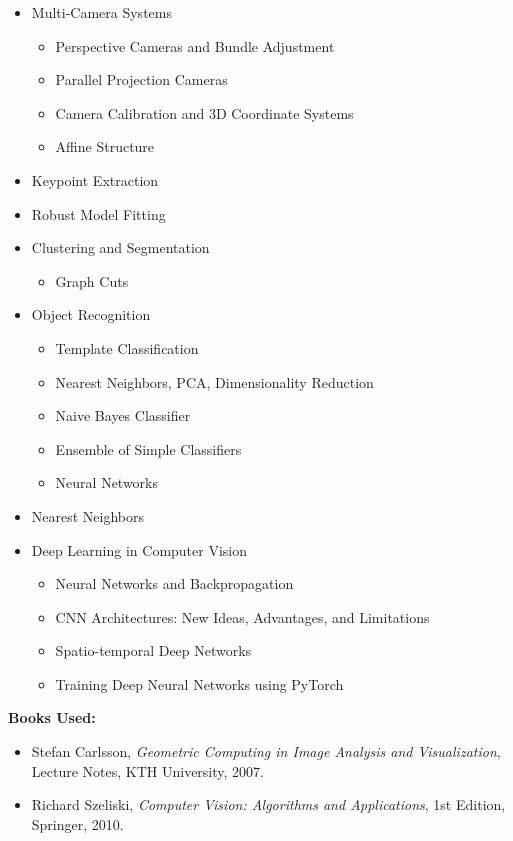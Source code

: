 \documentclass[12pt]{article}
\begin{document}
\begin{itemize}
    \item Multi-Camera Systems
    \begin{itemize}
        \item Perspective Cameras and Bundle Adjustment
        \item Parallel Projection Cameras
        \item Camera Calibration and 3D Coordinate Systems
        \item Affine Structure
    \end{itemize}
    
    \item Keypoint Extraction
    \item Robust Model Fitting
    \item Clustering and Segmentation
    \begin{itemize}
        \item Graph Cuts
    \end{itemize}
    
    \item Object Recognition
    \begin{itemize}
        \item Template Classification
        \item Nearest Neighbors, PCA, Dimensionality Reduction
        \item Naive Bayes Classifier
        \item Ensemble of Simple Classifiers
        \item Neural Networks
    \end{itemize}
    
    \item Nearest Neighbors
    \item Deep Learning in Computer Vision
    \begin{itemize}
        \item Neural Networks and Backpropagation
        \item CNN Architectures: New Ideas, Advantages, and Limitations
        \item Spatio-temporal Deep Networks
        \item Training Deep Neural Networks using PyTorch
    \end{itemize}
\end{itemize}

\textbf{Books Used:}
\begin{itemize}
    \item Stefan Carlsson, \textit{Geometric Computing in Image Analysis and Visualization}, Lecture Notes, KTH University, 2007.
    \item Richard Szeliski, \textit{Computer Vision: Algorithms and Applications}, 1st Edition, Springer, 2010.
\end{itemize}
\end{document}
